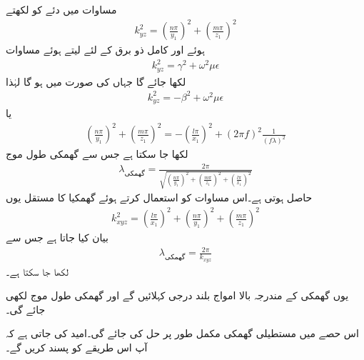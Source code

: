 مساوات  میں دئے  کو  لکھتے
\begin{align}
k_{yz}^2=\left( \frac{n \pi}{y_1}\right)^2+\left( \frac{m \pi}{z_1}\right)^2
\end{align}
ہوئے اور کامل ذو برق کے لئے  لیتے ہوئے  مساوات  
\begin{align*}
k_{yz}^2=\gamma^2+\omega^2 \mu \epsilon
\end{align*}
لکھا جائے گا جہاں  کی صورت میں  ہو گا لہٰذا
\begin{align*}
k_{yz}^2=-\beta^2+\omega^2 \mu \epsilon
\end{align*}
یا
\begin{align*}
\left( \frac{n \pi}{y_1}\right)^2+\left( \frac{m \pi}{z_1}\right)^2=-\left(\frac{l \pi}{x_1}\right)^2+\left(2\pi f\right)^2 \frac{1}{\left(f \lambda\right)^2}
\end{align*}
لکھا جا سکتا ہے جس سے گھمکی طول موج
\begin{align}
\lambda_{\text{گھمکی}}=\frac{2\pi}{\sqrt{\left( \frac{n \pi}{y_1}\right)^2+\left( \frac{m \pi}{z_1}\right)^2+\left(\frac{l \pi}{x_1}\right)^2}}
\end{align}
حاصل ہوتی ہے۔اس مساوات کو استعمال کرتے ہوئے گھمکیا کا مستقل  یوں
\begin{align}
k_{xyz}^2=\left(\frac{l \pi}{x_1}\right)^2+\left( \frac{n \pi}{y_1}\right)^2+\left( \frac{m \pi}{z_1}\right)^2
\end{align}
 بیان کیا جاتا ہے جس سے 
\begin{align}
\lambda_{\text{گھمکی}}=\frac{2\pi}{k_{xyz}}
\end{align}
لکھا جا سکتا ہے۔

یوں گھمکی کے مندرجہ بالا امواج بلند درجی  کہلائیں گے اور گھمکی طول موج  لکھی جائے گی۔



اس حصے میں مستطیلی گھمکی مکمل طور پر حل کی جائے گی۔امید کی جاتی ہے کہ آپ اس طریقے کو پسند کریں گے۔

